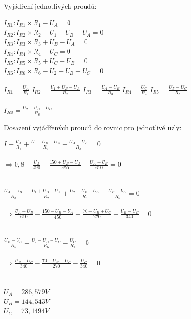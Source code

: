 \documentclass[12pt,a4paper,titlepage,final]{article}
\begin{document}
	Vyjádření jednotlivých proudů:
	
	\begin{tabbing}
		$I_{R1}: I_{R1} \times R_{1} - U_{A} = 0$ \\
		$I_{R2}: I_{R2} \times R_{2} - U_{1} - U_{B} + U_{A} = 0$ \\
		$I_{R3}: I_{R3} \times R_{3} + U_{B} - U_{A} = 0$ \\
		$I_{R4}: I_{R4} \times R_{4} - U_{C} = 0$ \\
		$I_{R5}: I_{R5} \times R_{5} + U_{C} - U_{B} = 0$ \\
		$I_{R6}: I_{R6} \times R_{6} - U_{2} + U_{B} - U_{C} = 0$ \\
		\\
		${ \displaystyle I_{R1} = \frac{U_{A}}{R_{1}} }$ \quad
		${ \displaystyle I_{R2} = \frac{U_{1} + U_{B} - U_{A}}{R_{2}} }$ \quad
		${ \displaystyle I_{R3} = \frac{U_{A} - U_{B}}{R_{3}} }$ \quad
		${ \displaystyle I_{R4} = \frac{U_{C}}{R_{4}} }$ \quad
		${ \displaystyle I_{R5} = \frac{U_{B} - U_{C}}{R_{5}} }$ \\
		\\
		${ \displaystyle I_{R6} = \frac{U_{2} - U_{B} + U_{C}}{R_{6}} }$		
	\end{tabbing}
	\newpage
	Dosazení vyjádřených proudů do rovnic pro jednotlivé uzly:
	
	\begin{tabbing}
		${ \displaystyle I - 
		\frac{U_{A}}{R_{1}} + 
		\frac{U_{1} + U_{B} - U_{A}}{R_{2}} -
		\frac{U_{A} - U_{B}}{R_{3}} = 0 } $ \\ \\ \qquad $\Longrightarrow
		{ \displaystyle 0,8 - 
		\frac{U_{A}}{490} + 
		\frac{150 + U_{B} - U_{A}}{450} -
		\frac{U_{A} - U_{B}}{610} = 0 }$ \\
		\\ \\
		${ \displaystyle 
		\frac{U_{A} - U_{B}}{R_{3}} - 
		\frac{U_{1} + U_{B} - U_{A}}{R_{2}} + 
		\frac{U_{2} - U_{B} + U_{C}}{R_{6}} -
		\frac{U_{B} - U_{C}}{R_{5}} = 0 }$  \\ \\ \qquad $\Longrightarrow
		{ \displaystyle 
		\frac{U_{A} - U_{B}}{610} - 
		\frac{150 + U_{B} - U_{A}}{450} + 
		\frac{70 - U_{B} + U_{C}}{270} -
		\frac{U_{B} - U_{C}}{340} = 0 }$ \\
		\\ \\
		${ \displaystyle 
		\frac{U_{B} - U_{C}}{R_{5}} - 
		\frac{U_{2} - U_{B} + U_{C}}{R_{6}} -
		\frac{U_{C}}{R_{4}} = 0}$ \\ \\ \qquad $\Longrightarrow
		{ \displaystyle 
		\frac{U_{B} - U_{C}}{340} - 
		\frac{70 - U_{B} + U_{C}}{270} -
		\frac{U_{C}}{340} = 0}$ \\
		\\ \\
		$ U_{A} = 286,579 V $ \\
		$ U_{B} = 144,543 V $ \\
		$ U_{C} = 73,1494 V $ \\		
	\end{tabbing}
	
\end{document}
